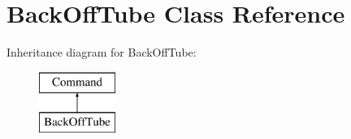 \hypertarget{classBackOffTube}{\section{Back\-Off\-Tube Class Reference}
\label{classBackOffTube}
}
Inheritance diagram for Back\-Off\-Tube\-:\begin{figure}[H]
\begin{center}
\leavevmode
\includegraphics[height=2.000000cm]{classBackOffTube}
\end{center}
\end{figure}

